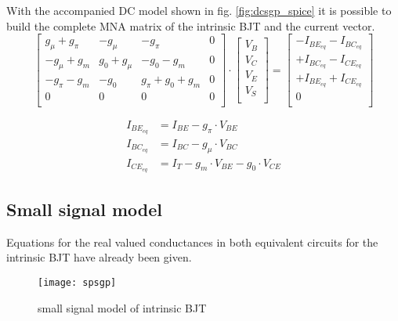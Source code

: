 With the accompanied DC model shown in fig. \ref{fig:dcsgp_spice} it
is possible to build the complete MNA matrix of the intrinsic BJT and
the current vector.
\begin{equation}
\begin{bmatrix}
g_{\mu} + g_{\pi} & -g_{\mu} & -g_{\pi} & 0\\
-g_{\mu} + g_{m} & g_{0} + g_{\mu} & -g_{0} - g_{m} & 0\\
-g_{\pi} - g_{m} & -g_{0} & g_{\pi} + g_{0} + g_{m} & 0\\
0 & 0 & 0 & 0\\
\end{bmatrix}
\cdot
\begin{bmatrix}
V_{B}\\
V_{C}\\
V_{E}\\
V_{S}\\
\end{bmatrix}
=
\begin{bmatrix}
-I_{BE_{eq}} - I_{BC_{eq}}\\
+I_{BC_{eq}} - I_{CE_{eq}}\\
+I_{BE_{eq}} + I_{CE_{eq}}\\
0\\
\end{bmatrix}
\end{equation}

\begin{align}
I_{BE_{eq}} &= I_{BE} - g_{\pi} \cdot V_{BE}\\
I_{BC_{eq}} &= I_{BC} - g_{\mu} \cdot V_{BC}\\
I_{CE_{eq}} &= I_{T} - g_{m} \cdot V_{BE} - g_{0} \cdot V_{CE}
\end{align}

\subsection{Small signal model}

Equations for the real valued conductances in both equivalent circuits
for the intrinsic BJT have already been given.
\begin{figure}[ht]
\begin{center}
\texttt{[image: spsgp]}
\end{center}
\caption{small signal model of intrinsic BJT}
\label{fig:spsgp}
\end{figure}
\FloatBarrier

